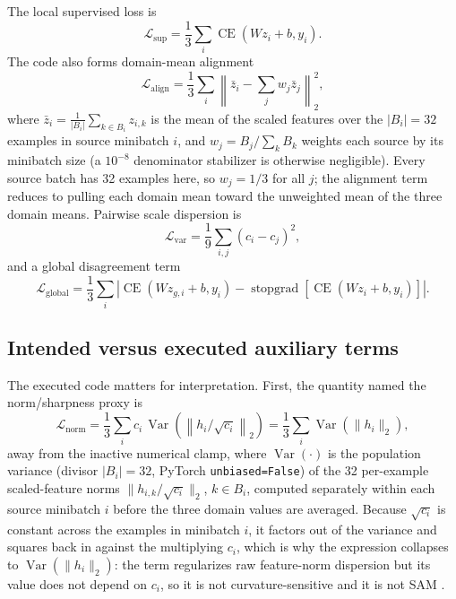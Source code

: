 \documentclass[10pt]{article}
\begin{document}
The local supervised loss is
\begin{equation}
\mathcal L_{\mathrm{sup}}=\frac{1}{3}\sum_i
\operatorname{CE}(Wz_i+b,y_i).
\end{equation}
The code also forms domain-mean alignment
\begin{equation}
\mathcal L_{\mathrm{align}}=
\frac{1}{3}\sum_i\left\|\bar z_i-\sum_jw_j\bar z_j\right\|_2^2 ,
\end{equation}
where $\bar z_i=\frac{1}{|B_i|}\sum_{k\in B_i}z_{i,k}$ is the mean of the
scaled features over the $|B_i|=32$ examples in source minibatch $i$, and
$w_j=B_j/\sum_kB_k$ weights each source by its minibatch size (a
$10^{-8}$ denominator stabilizer is otherwise negligible). Every source batch
has 32 examples here, so $w_j=1/3$ for all $j$; the alignment term reduces to
pulling each domain mean toward the unweighted mean of the three domain means.
Pairwise scale dispersion is
\begin{equation}
\mathcal L_{\mathrm{var}}=\frac{1}{9}\sum_{i,j}(c_i-c_j)^2 ,
\end{equation}
and a global disagreement term
\begin{equation}
\mathcal L_{\mathrm{global}}=\frac{1}{3}\sum_i
\left|\operatorname{CE}(Wz_{g,i}+b,y_i)
-\operatorname{stopgrad}\!\left[
\operatorname{CE}(Wz_i+b,y_i)\right]\right|.
\end{equation}

\subsection{Intended versus executed auxiliary terms}
\label{sec:executed}

The executed code matters for interpretation. First, the quantity named the
norm/sharpness proxy is
\begin{equation}
\mathcal L_{\mathrm{norm}}=
\frac{1}{3}\sum_i c_i\,\operatorname{Var}\!\left(
\left\|h_i/\sqrt{c_i}\right\|_2\right)
=\frac{1}{3}\sum_i\operatorname{Var}(\|h_i\|_2),
\label{eq:cancellation}
\end{equation}
away from the inactive numerical clamp, where $\operatorname{Var}(\cdot)$ is
the population variance (divisor $|B_i|=32$, PyTorch \texttt{unbiased=False})
of the 32 per-example scaled-feature norms $\|h_{i,k}/\sqrt{c_i}\|_2$,
$k\in B_i$, computed separately within each source minibatch $i$ before the
three domain values are averaged. Because $\sqrt{c_i}$ is constant across the
examples in minibatch $i$, it factors out of the variance and squares back in
against the multiplying $c_i$, which is why the expression collapses to
$\operatorname{Var}(\|h_i\|_2)$: the term regularizes raw feature-norm
dispersion but its value does not depend on $c_i$, so it is not
curvature-sensitive and it is not SAM \citep{foret2021sharpness}.
\end{document}
